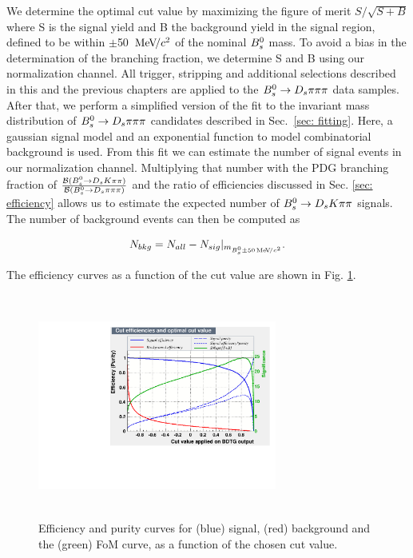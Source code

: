        
We determine the optimal cut value by maximizing the figure of merit $S/\sqrt{S+B}$ where S is the signal yield and B the background yield in the signal region, defined to be within $\pm$50 ${\mathrm{\,Me\kern -0.1em V\!/}c^2}$ of the nominal ${{B}^0_{s}}$ mass. 
To avoid a bias in the determination of the branching fraction, we determine S and B using our normalization channel. 
All trigger, stripping and additional selections described in this and the previous chapters are applied to the ${{B}^0_{s}}\rightarrow{\ensuremath{{D}_{s}}}{\ensuremath{\pi}}{\ensuremath{\pi}}{\ensuremath{\pi}}$ data samples. 
After that, we perform a simplified version of the fit to the invariant mass distribution of ${{B}^0_{s}}\rightarrow{\ensuremath{{D}_{s}}}{\ensuremath{\pi}}{\ensuremath{\pi}}{\ensuremath{\pi}}$ candidates described in Sec.~\ref{sec: fitting}.
Here, a gaussian signal model and an exponential function to model combinatorial background is used.
From this fit we can estimate the number of signal events in our normalization channel. 
Multiplying that number with the PDG branching fraction of $\frac{\mathcal{B}({{B}^0_{s}}\rightarrow{\ensuremath{{D}_{s}}}{\ensuremath{K}}{\ensuremath{\pi}}{\ensuremath{\pi}})}{\mathcal{B}({{B}^0_{s}}\rightarrow{\ensuremath{{D}_{s}}}{\ensuremath{\pi}}{\ensuremath{\pi}}{\ensuremath{\pi}})}$ and the ratio of efficiencies discussed in Sec. \ref{sec: efficiency} allows us to estimate the expected number of ${{B}^0_{s}}\rightarrow{\ensuremath{{D}_{s}}}{\ensuremath{K}}{\ensuremath{\pi}}{\ensuremath{\pi}}$ signals. The number of background events can then be computed as

\begin{equation}
 N_{bkg}=N_{all}-N_{sig}|_{m_{{{B}^0_{s}}\pm50{\mathrm{\,Me\kern -0.1em V\!/}c^2}}}.   
\end{equation}

The efficiency curves as a function of the cut value are shown in Fig. \ref{fig:BDT_Efficiency}.


\begin{figure}[h]
\includegraphics[height=7.4cm,width=0.7\textwidth]{figs/BDT_CutEfficiency.pdf}
\caption{Efficiency and purity curves for (blue) signal, (red) background and the (green) FoM curve, as a function of the chosen cut value.}
\label{fig:BDT_Efficiency}
\end{figure}
